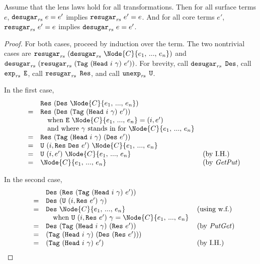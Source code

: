 \begin{theorem}
\label{thm:reval-exp}
Assume that the lens laws hold for all transformations. Then for all
surface terms $e$, $\textnormal{\texttt{desugar}}_{\mathit{rs}}\ {e} = e'$ implies $\textnormal{\texttt{resugar}}_{\mathit{rs}}\ {e'} =
e$. And for all core terms $e'$, $\textnormal{\texttt{resugar}}_{\mathit{rs}}\ {e'} = e$ implies
$\textnormal{\texttt{desugar}}_{\mathit{rs}}\ {e} = e'$.
\end{theorem}
\begin{proof}
For both cases, proceed by induction over the term. The two nontrivial
cases are $\UnexpandRec{(\ExpandRec{\Node{C}{e_1,\,...,\,e_n}})}$ and \\ %
$\textnormal{\texttt{desugar}}_{\mathit{rs}}\ {(\textnormal{\texttt{resugar}}_{\mathit{rs}}\ {(\texttt{Tag}\ (\texttt{Head}\ i\ \gamma)\ e')})}$. For brevity, call
$\textnormal{\texttt{desugar}}_{\mathit{rs}}$ $\textnormal{\texttt{Des}}$, call $\texttt{exp}_{\mathit{rs}}$ $\textnormal{\texttt{E}}$, call $\textnormal{\texttt{resugar}}_{\mathit{rs}}$
$\textnormal{\texttt{Res}}$, and call $\textnormal{\texttt{unexp}}_{\mathit{rs}}$ $\textnormal{\texttt{U}}$.

In the first case,
\[\begin{array}{llll}
  &&  \UnexpR{(\ExpR{\Node{C}{e_1,\,...,\,e_n}})} \\
  &=& \UnexpR{(\ExpR{\Tag{\MacHead{i}{\gamma}}{e'}})} \\
  &&  \ \ \text{ when }
        \Expd{\Node{C}{e_1,\,...,\,e_n}} = (i, e') \\
  &&  \ \ \text{ and where $\gamma$ stands in for
          $\Node{C}{e_1,\,...,\,e_n}$} \\
  &=& \UnexpR{\Tag{\MacHead{i}{\gamma}}{(\ExpR{e'})}} \\
  &=& \Unexp{(i, \UnexpR{\ExpR{e'}})}{\Node{C}{e_1,\,...,\,e_n}} \\
  &=& \Unexp{(i, e')}{\Node{C}{e_1,\,...,\,e_n}} & \text{ \!(by I.H.)} \\
  &=& \Node{C}{e_1,\,...,\,e_n} &\text{ \!(by \Getput)}
\end{array}\]

In the second case,
\[\begin{array}{llll}
  && \ExpR{(\UnexpR{\Tag{\MacHead{i}{\gamma}}{e'}})} \\
  &=& \ExpR{(\Unexp{(i, \UnexpR{e'})}{\gamma})} \\
  &=& \ExpR{\Node{C}{e_1,\,...,\,e_n}} &\text{ \!(using w.f.)} \\
    && \ \ \text{ when }
       \Unexp{(i, \UnexpR{e'})}{\gamma} = \Node{C}{e_1,\,...,\,e_n} \\
  &=& \ExpR{\Tag{\MacHead{i}{\gamma}}{(\UnexpR{e'})}}
    &\text{ \!(by \Putget)} \\
  &=& \Tag{\MacHead{i}{\gamma}}{(\ExpR{(\UnexpR{e'})})} \\
  &=& \Tag{\MacHead{i}{\gamma}}{e'}
    &\text{ \!(by I.H.)}
\end{array}\]
\end{proof}



